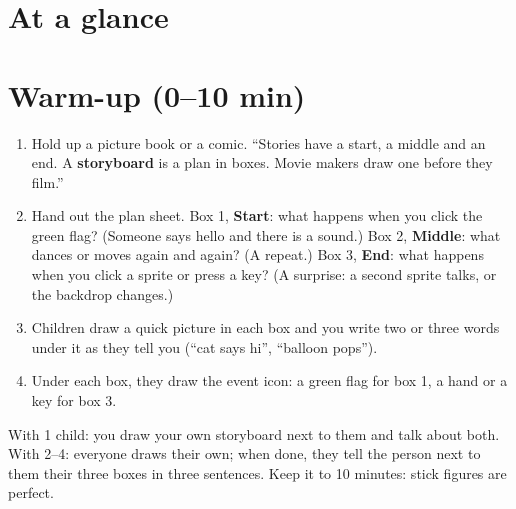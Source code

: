 \section{At a glance}
\begin{timeplan}
\end{timeplan}

\section{Warm-up (0--10 min)}
\begin{unplugged}
\begin{enumerate}[leftmargin=1.4em,itemsep=1pt]
  \item Hold up a picture book or a comic. \enquote{Stories have a start, a middle and an end. A \textbf{storyboard} is a plan in boxes. Movie makers draw one before they film.}
  \item Hand out the plan sheet. Box 1, \textbf{Start}: what happens when you click the green flag? (Someone says hello and there is a sound.) Box 2, \textbf{Middle}: what dances or moves again and again? (A repeat.) Box 3, \textbf{End}: what happens when you click a sprite or press a key? (A surprise: a second sprite talks, or the backdrop changes.)
  \item Children draw a quick picture in each box and you write two or three words under it as they tell you (\enquote{cat says hi}, \enquote{balloon pops}).
  \item Under each box, they draw the event icon: a green flag for box 1, a hand or a key for box 3.
\end{enumerate}
With 1 child: you draw your own storyboard next to them and talk about both. With 2--4: everyone draws their own; when done, they tell the person next to them their three boxes in three sentences. Keep it to 10 minutes: stick figures are perfect.
\end{unplugged}

